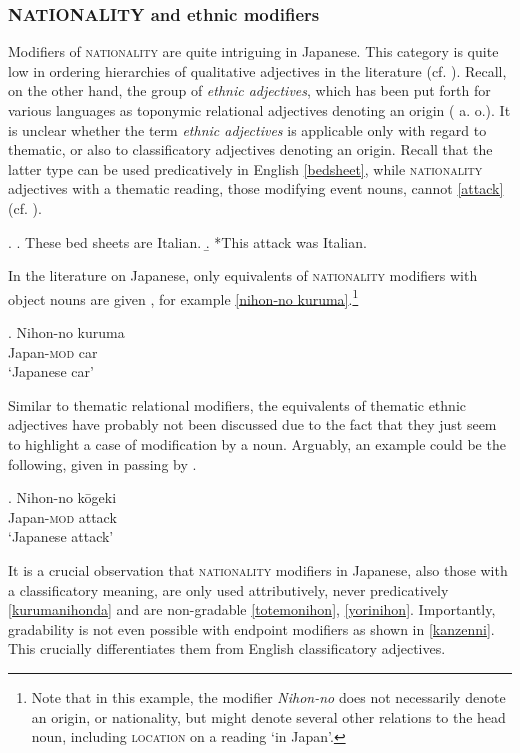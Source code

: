 \documentclass [output=book,colorlinks,citecolor=brown]{langscibook}
\begin{document}
\subsubsection{NATIONALITY and ethnic modifiers}

Modifiers of \textsc{nationality} are quite intriguing in Japanese. This category is quite low in ordering hierarchies of qualitative adjectives in the literature (cf. \citealt{scott:2002:stacked}). Recall, on the other hand, the group of \textit{ethnic adjectives}, which has been put forth for various languages as toponymic relational adjectives denoting an origin (\citealt{bartning:1984:aspects, bosque:1996:postnominal, gunkel:2008:constraints, alex:2011:ea} a. o.). It is unclear whether the term \textit{ethnic adjectives} is applicable only with regard to thematic, or also to classificatory adjectives denoting an origin. Recall that the latter type can be used predicatively in English \ref{bedsheet}, while \textsc{nationality} adjectives with a thematic reading, those modifying event nouns, cannot \ref{attack} (cf. \citealt{alex:2011:ea}). %

\ex. \a. These bed sheets are Italian. \label{bedsheet}
\b. *This attack was Italian. \label{attack}

In the literature on Japanese, only equivalents of \textsc{nationality} modifiers with object nouns are given \citep{morita:2011:three, nagano:2016:are}, for example \ref{nihon-no kuruma}.\footnote{Note that in this example, the modifier \textit{Nihon-no} does not necessarily denote an origin, or nationality, but might denote several other relations to the head noun, including \textsc{location} on a reading `in Japan’.}

\exg. Nihon-no kuruma\\
Japan-\textsc{mod} car\\
`Japanese car' \label{nihon-no kuruma}

Similar to thematic relational modifiers, the equivalents of thematic ethnic adjectives have probably not been discussed due to the fact that they just seem to highlight a case of modification by a noun. Arguably, an example could be the following, given in passing by \citet[48]{nagano:2016:are}. %

\exg. Nihon-no kōgeki\\
Japan-\textsc{mod} attack\\
`Japanese attack'

It is a crucial observation that \textsc{nationality} modifiers in Japanese, also those with a classificatory meaning, are only used attributively, never predicatively \ref{kurumanihonda} and are non-gradable \ref{totemonihon}, \ref{yorinihon}. Importantly, gradability is not even possible with endpoint modifiers as shown in \ref{kanzenni}. This crucially differentiates them from English classificatory adjectives. %
\end{document}
